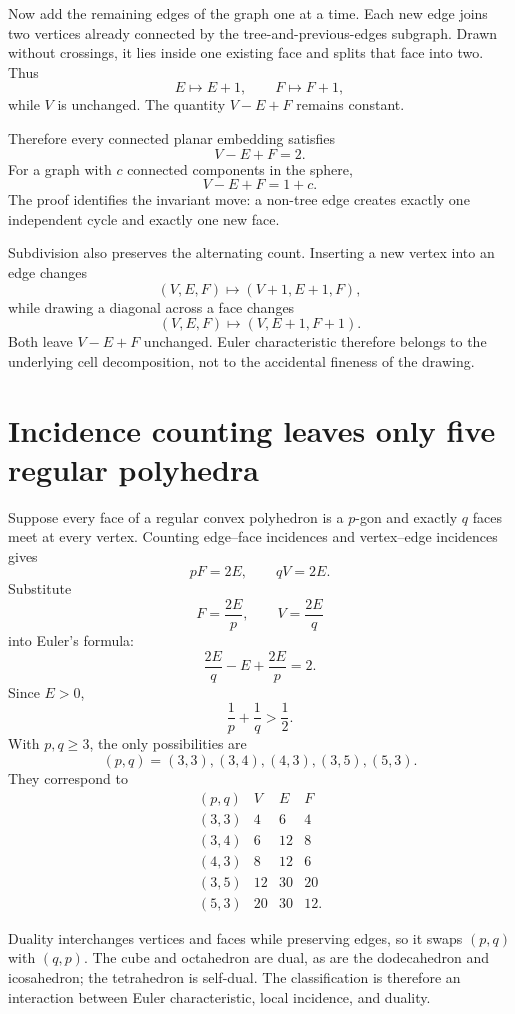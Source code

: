 Now add the remaining edges of the graph one at a time.  Each new edge joins two vertices already connected by the tree-and-previous-edges subgraph.  Drawn without crossings, it lies inside one existing face and splits that face into two.  Thus
\[
  E\longmapsto E+1,
  \qquad
  F\longmapsto F+1,
\]
while \(V\) is unchanged.  The quantity \(V-E+F\) remains constant.

Therefore every connected planar embedding satisfies
\[
  \boxed{V-E+F=2.}
\]
For a graph with \(c\) connected components in the sphere,
\[
  V-E+F=1+c.
\]
The proof identifies the invariant move: a non-tree edge creates exactly one independent cycle and exactly one new face.

Subdivision also preserves the alternating count.  Inserting a new vertex into an edge changes
\[
  (V,E,F)\longmapsto(V+1,E+1,F),
\]
while drawing a diagonal across a face changes
\[
  (V,E,F)\longmapsto(V,E+1,F+1).
\]
Both leave \(V-E+F\) unchanged.  Euler characteristic therefore belongs to the underlying cell decomposition, not to the accidental fineness of the drawing.

\section{Incidence counting leaves only five regular polyhedra}

Suppose every face of a regular convex polyhedron is a \(p\)-gon and exactly \(q\) faces meet at every vertex.  Counting edge--face incidences and vertex--edge incidences gives
\[
  pF=2E,
  \qquad
  qV=2E.
\]
Substitute
\[
  F=\frac{2E}{p},
  \qquad
  V=\frac{2E}{q}
\]
into Euler's formula:
\[
  \frac{2E}{q}-E+\frac{2E}{p}=2.
\]
Since \(E>0\),
\[
  \frac1p+\frac1q>\frac12.
\]
With \(p,q\ge3\), the only possibilities are
\[
  (p,q)=(3,3),(3,4),(4,3),(3,5),(5,3).
\]
They correspond to
\[
\begin{array}{c|c|c|c}
(p,q)&V&E&F\\ \hline
(3,3)&4&6&4\\
(3,4)&6&12&8\\
(4,3)&8&12&6\\
(3,5)&12&30&20\\
(5,3)&20&30&12.
\end{array}
\]

Duality interchanges vertices and faces while preserving edges, so it swaps \((p,q)\) with \((q,p)\).  The cube and octahedron are dual, as are the dodecahedron and icosahedron; the tetrahedron is self-dual.  The classification is therefore an interaction between Euler characteristic, local incidence, and duality.

